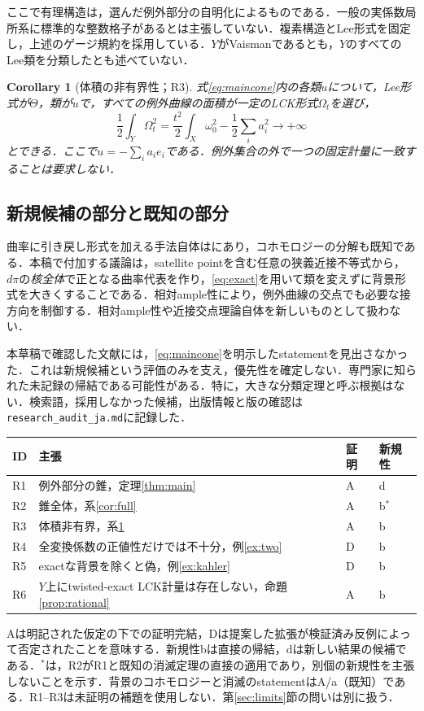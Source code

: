 \documentclass[12pt]{amsart}
\newtheorem{cor}[thm]{Corollary}
\theoremstyle{definition}
\theoremstyle{remark}
\numberwithin{equation}{section}
\begin{document}
ここで有理構造は，選んだ例外部分の自明化によるものである．一般の実係数局所系に標準的な整数格子があるとは主張していない．複素構造とLee形式を固定し，上述のゲージ規約を採用している．$Y$がVaismanであるとも，$Y$のすべてのLee類を分類したとも述べていない．

\begin{cor}[体積の非有界性；R3]\label{cor:volume}
式\eqref{eq:maincone}内の各類$u$について，Lee形式が$\Theta$，類が$u$で，すべての例外曲線の面積が一定のLCK形式$\Omega_t$を選び，
\begin{equation}\label{eq:volasym}
 \frac12\int_Y\Omega_t^2
 =\frac{t^2}{2}\int_X\omega_0^2-\frac12\sum_i a_i^2\longrightarrow+\infty
\end{equation}
とできる．ここで$u=-\sum_i a_ie_i$である．例外集合の外で一つの固定計量に一致することは要求しない．
\end{cor}

\subsection{新規候補の部分と既知の部分}
曲率に引き戻し形式を加える手法自体は\cite[Lemma 3.4]{OVV}にあり，コホモロジーの分解も既知である．本稿で付加する議論は，satellite pointを含む任意の狭義近接不等式から，$d\pi$の\emph{核全体}で正となる曲率代表を作り，\eqref{eq:exact}を用いて類を変えずに背景形式を大きくすることである．相対ample性により，例外曲線の交点でも必要な接方向を制御する．相対ample性や近接交点理論自体を新しいものとして扱わない．

本草稿で確認した文献には，\eqref{eq:maincone}を明示したstatementを見出さなかった．これは新規候補という評価のみを支え，優先性を確定しない．専門家に知られた未記録の帰結である可能性がある．特に，大きな分類定理と呼ぶ根拠はない．検索語，採用しなかった候補，出版情報と版の確認は\texttt{research\_audit\_ja.md}に記録した．

\begin{center}\small
\begin{tabular}{@{}p{1cm}p{8.4cm}p{1cm}p{1.5cm}@{}}
\toprule
ID & 主張 & 証明 & 新規性\\\midrule
R1 & 例外部分の錐，定理\ref{thm:main} & A & d\\
R2 & 錐全体，系\ref{cor:full} & A & b$^*$\\
R3 & 体積非有界，系\ref{cor:volume} & A & b\\
R4 & 全変換係数の正値性だけでは不十分，例\ref{ex:two} & D & b\\
R5 & exactな背景を除くと偽，例\ref{ex:kahler} & D & b\\
R6 & $Y$上にtwisted-exact LCK計量は存在しない，命題\ref{prop:rational} & A & b\\
\bottomrule
\end{tabular}
\end{center}
Aは明記された仮定の下での証明完結，Dは提案した拡張が検証済み反例によって否定されたことを意味する．新規性bは直接の帰結，dは新しい結果の候補である．$^*$は，R2がR1と既知の消滅定理の直接の適用であり，別個の新規性を主張しないことを示す．背景のコホモロジーと消滅のstatementはA/a（既知）である．R1--R3は未証明の補題を使用しない．第\ref{sec:limits}節の問いは別に扱う．
\end{document}
